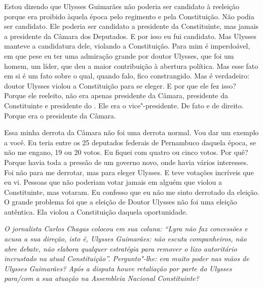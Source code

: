 Estou dizendo que Ulysses Guimarães não poderia ser candidato à
reeleição porque era proibido àquela época pelo regimento e pela
Constituição. Não podia ser candidato. Ele poderia ser candidato a
presidente da Constituinte, mas jamais a presidente da Câmara dos
Deputados. E por isso eu fui candidato. Mas Ulysses manteve a
candidatura dele, violando a Constituição. Para mim é imperdoável, em
que pese eu ter uma admiração grande por doutor Ulysses, que foi um
homem, um líder, que deu a maior contribuição à abertura política. Mas
esse fato em si é um fato sobre o qual, quando falo, fico constrangido.
Mas é verdadeiro: doutor Ulysses violou a Constituição para se eleger. E
por que ele fez isso? Porque ele reeleito, não era apenas presidente da
Câmara, presidente da Constituinte e presidente do . Ele era o
vice"-presidente. De fato e de direito. Porque era o presidente da
Câmara.

Essa minha derrota da Câmara não foi uma derrota normal. Vou dar um
exemplo a você. Eu teria entre os 25 deputados federais de Pernambuco
daquela época, se não me engano, 19 ou 20 votos. Eu fiquei com quatro ou
cinco votos. Por quê? Porque havia toda a pressão de um governo novo,
onde havia vários interesses. Foi não para me derrotar, mas para eleger
Ulysses. E teve votações incríveis que eu vi. Pessoas que não poderiam
votar jamais em alguém que violou a Constituinte, mas votaram. Eu
confesso que eu não me sinto derrotado da eleição. O grande problema foi
que a eleição de Doutor Ulysses não foi uma eleição autêntica. Ela
violou a Constituição daquela oportunidade.

\medskip

\noindent\emph{O jornalista Carlos Chagas colocou em sua coluna: ``Lyra não faz
concessões e acusa a sua direção, isto é, Ulysses Guimarães: não escuta
companheiros, não abre debate, não elabora qualquer estratégia para
remover o lixo autoritário incrustado na atual Constituição''.
Pergunto"-lhe: era muito poder nas mãos de Ulysses Guimarães? Após a
disputa houve retaliação por parte do Ulysses para/com a sua atuação na
Assembleia Nacional Constituinte?}

